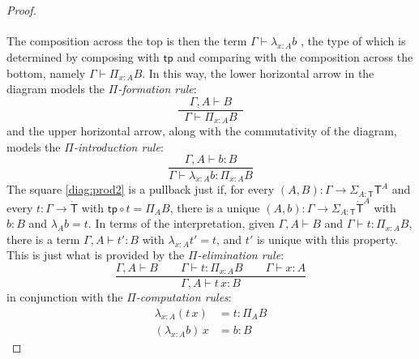 \documentclass[12pt,reqno]{amsart}
\newcommand{\ednote}[1]{[\textit{\color{red}{#1}}]} %
\newcommand{\DD}{\ensuremath{\mathcal{D}}}
\newcommand{\tp}{\ensuremath{\mathsf{tp}}}
\newcommand{\alg}[1]{\ensuremath{\mathsf{#1}}}
\renewcommand{\to}{\ensuremath{\rightarrow}}
\newcommand{\G}{\ensuremath{\Gamma}}
\newcommand{\ext}[2]{{#1,#2}}
\renewcommand{\t}{\ensuremath{\mathsf{t}}}
\newcommand{\tT}{\ensuremath{{\t}:\TT\to\T}}
\newcommand{\T}{\ensuremath{\mathsf{T}}}
\newcommand{\TT}{\ensuremath{\dot{\mathsf{T}}}}
\newtheorem{theorem}{Theorem}
\theoremstyle{remark}
\theoremstyle{definition}
\begin{document}
\begin{proof}
\begin{equation*}
\begin{tikzcd}
\end{tikzcd}
\end{equation*}
The composition across the top is then the term $\G \vdash \lambda_{x:A} b$ , the type of which is determined by composing with $\tp$ and comparing with the composition across the bottom, namely $\G \vdash \Pi_{x:A} B$. In this way, the lower horizontal arrow in the diagram models the \emph{$\Pi$-formation rule}:
\[
\frac{\quad\ext{\G}{A}\vdash B\quad}{\G\vdash \Pi_{x:A} B}
\]
and the upper horizontal arrow, along with the commutativity of the diagram, models the \emph{$\Pi$-introduction rule}:
\[
\frac{\ext{\G}{A}\vdash b:B}{\G\vdash \lambda_{x:A} b : \Pi_{x:A} B}
\]
The square \eqref{diag:prod2} is a pullback just if, for every $(A,B) : \G \to \Sigma_{A:\T}\T^A$ and every $t: \G \to \TT$ with $\tp \circ t = \Pi_A B$, there is a unique $(A,b) : \G \to \Sigma_{A:\T}\TT^A$ with $b:B$ and $\lambda_A b = t$.  In terms of the interpretation, given $\ext{\G}{A} \vdash B$ and $\G\vdash t: \Pi_{x:A} B$, there is a term $\ext{\G}{A}\vdash t':B$ with $\lambda_{x:A}  t' = t$, and $t'$ is unique with this property.  This is just what is provided by the \emph{$\Pi$-elimination rule}:
\[
\frac{{\ext{\G}{A} \vdash B}\qquad {\G \vdash t : \Pi_{x:A}  B} \qquad {\G \vdash x:A}}{{\ext{\G}{A}\vdash t\, x :B}}
\]
in conjunction with the \emph{$\Pi$-computation rules}:
\begin{align*}
\lambda_{x:A} (t\,x) &= t : \Pi_A B\\
(\lambda_{x:A} b)\,x &= b : B
\end{align*}
\end{proof}
%
%
%
%
%
%
%
%
%
\end{document}
